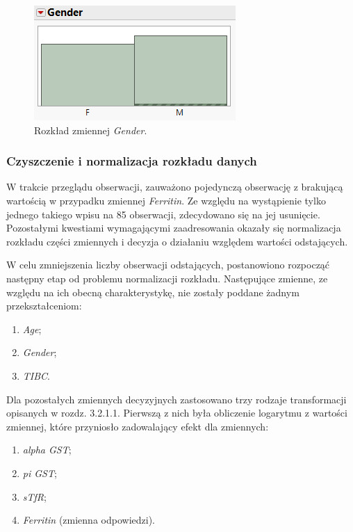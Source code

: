 	\begin{figure}[!ht]
		\centering
		\includegraphics[width=0.6\linewidth]{Rozdzial3/mnf}
		\caption{Rozkład zmiennej \textit{Gender}.}
		\label{fig:mnf}
	\end{figure}
	
	\subsubsection{Czyszczenie i normalizacja rozkładu danych}
	
	W trakcie przeglądu obserwacji, zauważono pojedynczą obserwację z brakującą wartością w przypadku zmiennej \textit{Ferritin}. Ze względu na wystąpienie tylko jednego takiego wpisu na 85 obserwacji, zdecydowano się na jej usunięcie. Pozostałymi kwestiami wymagającymi zaadresowania okazały się normalizacja rozkładu części zmiennych i decyzja o działaniu względem wartości odstających.
	
	W celu zmniejszenia liczby obserwacji odstających, postanowiono rozpocząć następny etap od problemu normalizacji rozkładu. Następujące zmienne, ze względu na ich obecną charakterystykę, nie zostały poddane żadnym przekształceniom:
	
	\begin{enumerate}
		\item \textit{Age};
		\item \textit{Gender};
		\item \textit{TIBC}.
	\end{enumerate}

	Dla pozostałych zmiennych decyzyjnych zastosowano trzy rodzaje transformacji opisanych w rozdz. 3.2.1.1. Pierwszą z nich była obliczenie logarytmu z wartości zmiennej, które przyniosło zadowalający efekt dla zmiennych:
	
	\begin{enumerate}
		\item \textit{alpha GST};
		\item \textit{pi GST};
		\item \textit{sTfR};
		\item \textit{Ferritin} (zmienna odpowiedzi).
	\end{enumerate}

